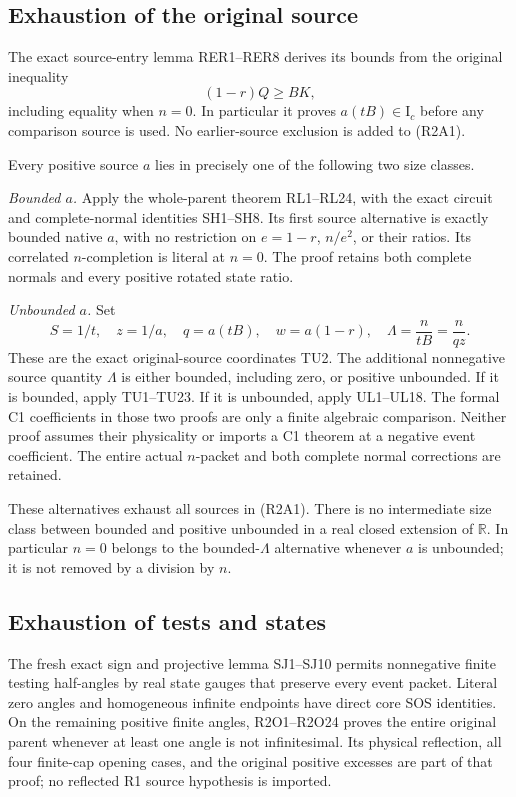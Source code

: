 \subsection{Exhaustion of the original source}

The exact source-entry lemma RER1--RER8 derives its bounds from
the original inequality
\[
 (1-r)Q\geq BK,
\]
including equality when \(n=0\).  In particular it proves
\(a(tB)\in\mathrm I_c\) before any comparison source is used.
No earlier-source exclusion is added to (R2A1).

Every positive source \(a\) lies in precisely one of the following
two size classes.

\emph{Bounded \(a\).}
Apply the whole-parent theorem RL1--RL24, with the exact circuit
and complete-normal identities SH1--SH8.
Its first source alternative is exactly bounded native \(a\),
with no restriction on \(e=1-r\), \(n/e^2\), or their ratios.
Its correlated \(n\)-completion is literal at \(n=0\).
The proof retains both complete normals and every positive
rotated state ratio.

\emph{Unbounded \(a\).}
Set
\[
 S=1/t,\quad z=1/a,\quad q=a(tB),\quad
 w=a(1-r),\quad \Lambda=\frac{n}{tB}=\frac{n}{qz}.
                                                               \tag{R2A3}
\]
These are the exact original-source coordinates TU2.
The additional nonnegative source quantity \(\Lambda\) is either
bounded, including zero, or positive unbounded.
If it is bounded, apply TU1--TU23.
If it is unbounded, apply UL1--UL18.
The formal C1 coefficients in those two proofs are only a finite
algebraic comparison.  Neither proof assumes their physicality
or imports a C1 theorem at a negative event coefficient.
The entire actual \(n\)-packet and both complete normal
corrections are retained.

These alternatives exhaust all sources in (R2A1).
There is no intermediate size class between bounded and
positive unbounded in a real closed extension of \(\mathbb R\).
In particular \(n=0\) belongs to the bounded-\(\Lambda\)
alternative whenever \(a\) is unbounded; it is not removed by
a division by \(n\).

\subsection{Exhaustion of tests and states}

The fresh exact sign and projective lemma SJ1--SJ10 permits
nonnegative finite testing half-angles by real state gauges
that preserve every event packet.  Literal zero angles and
homogeneous infinite endpoints have direct core SOS identities.
On the remaining positive finite angles, R2O1--R2O24 proves
the entire original parent whenever at least one angle is
not infinitesimal.  Its physical reflection, all four
finite-cap opening cases, and the original positive excesses
are part of that proof; no reflected R1 source hypothesis
is imported.

